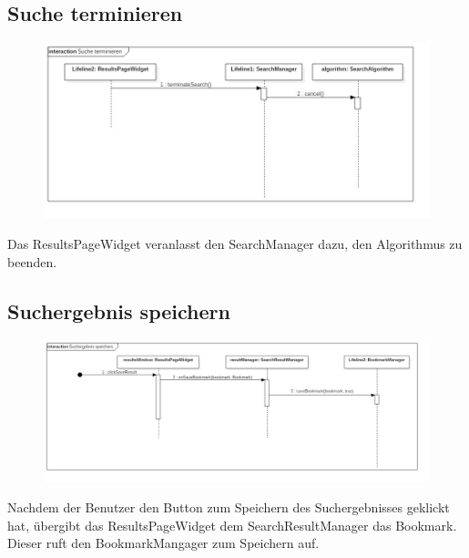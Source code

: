 \subsection{Suche terminieren}

\begin{figure}[H]
\centering
\includegraphics[width=\linewidth]{img/Sequenzdiagramme/SucheTerminieren}
\label{fig:sucheTerminieren}
\end{figure}
Das ResultsPageWidget veranlasst den SearchManager dazu, den Algorithmus zu beenden.

\subsection{Suchergebnis speichern}

\begin{figure}[H]
\centering
\includegraphics[width=\linewidth]{img/Sequenzdiagramme/SuchergebnisSpeichern}
\label{fig:suchergebnisSpeichern}
\end{figure}
Nachdem der Benutzer den Button zum Speichern des Suchergebnisses geklickt hat, übergibt das ResultsPageWidget dem SearchResultManager das Bookmark. Dieser ruft den BookmarkMangager zum Speichern auf.